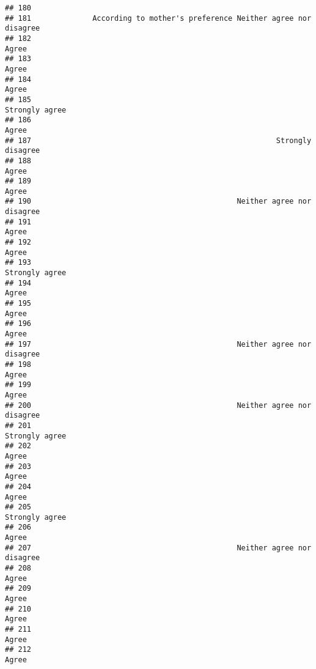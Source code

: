 \documentclass[
]{article}
\begin{document}
\begin{verbatim}
## 180                                                                         
## 181              According to mother's preference Neither agree nor disagree
## 182                                                                    Agree
## 183                                                                    Agree
## 184                                                                    Agree
## 185                                                           Strongly agree
## 186                                                                    Agree
## 187                                                        Strongly disagree
## 188                                                                    Agree
## 189                                                                    Agree
## 190                                               Neither agree nor disagree
## 191                                                                    Agree
## 192                                                                    Agree
## 193                                                           Strongly agree
## 194                                                                    Agree
## 195                                                                    Agree
## 196                                                                    Agree
## 197                                               Neither agree nor disagree
## 198                                                                    Agree
## 199                                                                    Agree
## 200                                               Neither agree nor disagree
## 201                                                           Strongly agree
## 202                                                                    Agree
## 203                                                                    Agree
## 204                                                                    Agree
## 205                                                           Strongly agree
## 206                                                                    Agree
## 207                                               Neither agree nor disagree
## 208                                                                    Agree
## 209                                                                    Agree
## 210                                                                    Agree
## 211                                                                    Agree
## 212                                                                    Agree

\end{verbatim}
\end{document}

